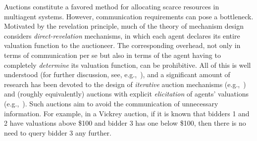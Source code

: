 \documentclass{aamas2013}
\begin{document}
Auctions constitute a favored method for allocating scarce resources in
multiagent systems.  However, communication requirements can pose a
bottleneck.  Motivated by the revelation principle, much of the theory of
mechanism design considers {\em direct-revelation} mechanisms, in which
each agent declares its entire valuation function to the auctioneer.  The
corresponding overhead, not only in terms of communication per se but also
in terms of the agent having to completely {\em determine} its valuation
function, can be prohibitive.  All of this is well understood (for further
discussion, see, e.g.,~\cite{Conitzer04:Computational}), and a significant amount of research has been
devoted to the design of {\em iterative} auction mechanisms (e.g.,~\cite{Parkes06:Iterative}) and (roughly
equivalently) auctions with explicit {\em elicitation} of agents'
valuations (e.g.,~\cite{Sandholm06:Preference}).  Such auctions aim to avoid the communication of
unnecessary information.  For example, in a Vickrey auction, if it is
known that bidders 1 and 2 have valuations above \$100 and bidder 3 has one
below \$100, then there is no need to query bidder 3 any further.
\end{document}
